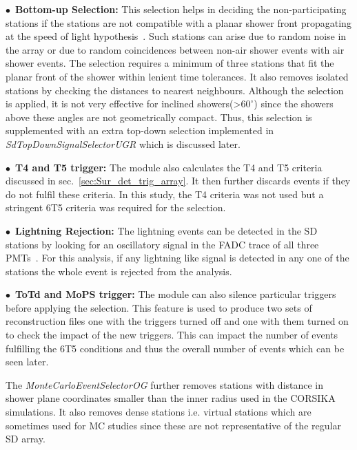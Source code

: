 \begin{description}
  \item $\bullet$~\textbf{Bottom-up Selection:} This selection helps in deciding the non-participating stations if the stations are not compatible with a planar shower front propagating at the speed of light hypothesis~\cite{gap_bottom_up}. Such stations can arise due to random noise in the array or due to random coincidences between non-air shower events with air shower events. The selection requires a minimum of three stations that fit the planar front of the shower within lenient time tolerances. It also removes isolated stations by checking the distances to nearest neighbours. Although the selection is applied, it is not very effective for inclined showers(>$60^{\circ}$) since the showers above these angles are not geometrically compact. Thus, this selection is supplemented with an extra top-down selection implemented in \textit{SdTopDownSignalSelectorUGR} which is discussed later. 
  \item $\bullet$~\textbf{T4 and T5 trigger:} The module also calculates the T4 and T5 criteria discussed in sec.~\ref{sec:Sur_det_trig_array}. It then further discards events if they do not fulfil these criteria. In this study, the T4 criteria was not used but a stringent 6T5 criteria was required for the selection. 
  \item $\bullet$~\textbf{Lightning Rejection:} The lightning events can be detected in the SD stations by looking for an oscillatory signal in the FADC trace of all three PMTs~\cite{2017AGUFMAE31A..06C}. For this analysis, if any lightning like signal is detected in any one of the stations the whole event is rejected from the analysis. 
  \item $\bullet$~\textbf{ToTd and MoPS trigger:} The module can also silence particular triggers before applying the selection. This feature is used to produce two sets of reconstruction files one with the triggers turned off and one with them turned on to check the impact of the new triggers. This can impact the number of events fulfilling the 6T5 conditions and thus the overall number of events which can be seen later.    
\end{description}

The \textit{MonteCarloEventSelectorOG} further removes stations with distance in shower plane coordinates smaller than the inner radius used in the CORSIKA simulations. It also removes dense stations i.e. virtual stations which are sometimes used for MC studies since these are not representative of the regular SD array. 

